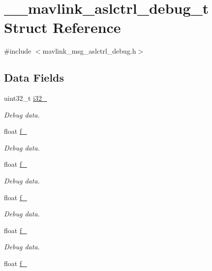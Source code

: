 \hypertarget{struct____mavlink__aslctrl__debug__t}{\section{\+\_\+\+\_\+mavlink\+\_\+aslctrl\+\_\+debug\+\_\+t Struct Reference}
\label{struct____mavlink__aslctrl__debug__t}
}


{\ttfamily \#include $<$mavlink\+\_\+msg\+\_\+aslctrl\+\_\+debug.\+h$>$}

\subsection*{Data Fields}
\begin{DoxyCompactItemize}
\item 
uint32\+\_\+t \hyperlink{struct____mavlink__aslctrl__debug__t_a4121734230f5a53db57af5f68742df7f}{i32\+\_}
\begin{DoxyCompactList}\small\item\em Debug data. \end{DoxyCompactList}\item 
float \hyperlink{struct____mavlink__aslctrl__debug__t_a3d8a2e23c21d52835e3f0031d1ccfae8}{f\+\_}
\begin{DoxyCompactList}\small\item\em Debug data. \end{DoxyCompactList}\item 
float \hyperlink{struct____mavlink__aslctrl__debug__t_a756a17218b77ac6f82100e1273044f18}{f\+\_}
\begin{DoxyCompactList}\small\item\em Debug data. \end{DoxyCompactList}\item 
float \hyperlink{struct____mavlink__aslctrl__debug__t_a7f939a1006fe709dd8f549a072901964}{f\+\_}
\begin{DoxyCompactList}\small\item\em Debug data. \end{DoxyCompactList}\item 
float \hyperlink{struct____mavlink__aslctrl__debug__t_adda7ef6bbf4a60e1e4c6e4c197978df0}{f\+\_}
\begin{DoxyCompactList}\small\item\em Debug data. \end{DoxyCompactList}\item 
float \hyperlink{struct____mavlink__aslctrl__debug__t_ad48835f355421536d40607cd40a415bd}{f\+\_}

\end{DoxyCompactItemize}
